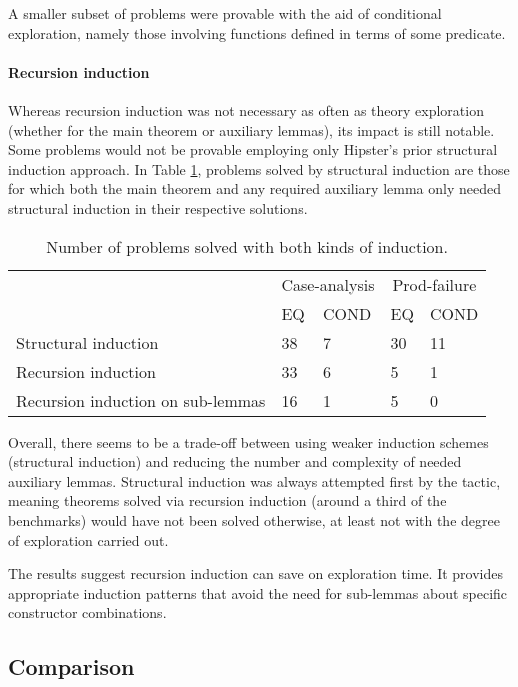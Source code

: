 A smaller subset of problems were provable with the aid of conditional exploration, namely those involving functions defined in terms of some predicate.

\paragraph{Recursion induction}

Whereas recursion induction was not necessary as often as theory exploration (whether for the main theorem or auxiliary lemmas), its impact is still notable.
%
Some problems would not be provable employing only Hipster's prior structural induction approach.
%
In Table \ref{tab:rec-ind}, problems solved by structural induction are those for which both the main theorem and any required auxiliary lemma only needed structural induction in their respective solutions.%
%

\noindent \begin{table}[h]
\begin{tabularx}{\textwidth}{l | X X | X X}
  & \multicolumn{2}{c|}{Case-analysis} & \multicolumn{2}{c}{Prod-failure} \\
  &  EQ & COND & EQ & COND \\
  \hline
  Structural induction & 38 & 7 & 30 & 11 \\
  Recursion induction & 33 & 6 & 5 & 1 \\
  Recursion induction on sub-lemmas & 16 & 1 & 5 & 0 \\
\end{tabularx}
\caption{Number of problems solved with both kinds of induction.}
\label{tab:rec-ind}
\end{table}

Overall, there seems to be a trade-off between using weaker induction schemes (structural induction) and reducing the number and complexity of needed auxiliary lemmas.
%
Structural induction was always attempted first by the tactic, meaning theorems solved via recursion induction (around a third of the benchmarks) would have not been solved otherwise, at least not with the degree of exploration carried out.
 
The results suggest recursion induction can save on exploration time.
%
It provides appropriate induction patterns that avoid the need for sub-lemmas about specific constructor combinations.


\subsection{Comparison}

